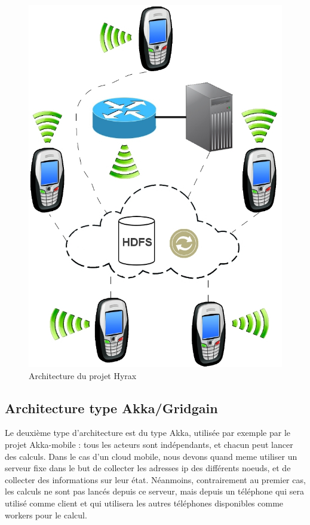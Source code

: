 \documentclass[a4paper,12pt]{article}
\begin{document}
\begin{figure}[h]
\centering \includegraphics[scale=0.4]{images/hyrax.png}
\caption{Architecture du projet Hyrax}
\end{figure}

\newpage

\subsection{Architecture type Akka/Gridgain}
Le deuxième type d’architecture est du type Akka, utilisée par exemple par le
projet Akka-mobile : tous les acteurs sont indépendants, et chacun peut lancer
des calculs. Dans le cas d’un cloud mobile, nous devons quand meme utiliser un
serveur fixe dans le but de collecter les adresses ip des différents noeuds, et
de collecter des informations sur leur état. Néanmoins, contrairement au
premier cas, les calculs ne sont pas lancés depuis ce serveur, mais depuis un
téléphone qui sera utilisé comme client et qui utilisera les autres téléphones
disponibles comme workers pour le calcul.
\end{document}
